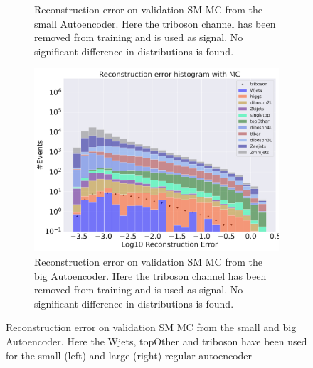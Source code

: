 \begin{figure}[H]
\begin{subfigure}{.45\textwidth}
        \caption{Reconstruction error on validation SM MC from the small Autoencoder. Here the triboson channel has been removed from training and 
        is used as signal. No significant difference in distributions is found. }
        \label{fig:ae_small_triboson}
    \end{subfigure}
    \hfill 
    \begin{subfigure}{.45\textwidth}
        \includegraphics[width=\textwidth]{Figures/AE_testing/big/b_data_recon_big_rm3_feats_sig_triboson.pdf}
        \caption{Reconstruction error on validation SM MC from the big Autoencoder. Here the triboson channel has been removed from training and 
        is used as signal. No significant difference in distributions is found. }
        \label{fig:ae_big_triboson}
    \end{subfigure}
    \hfill  
    \caption[AE | Channel removal, Wjets, topOther, triboson]{Reconstruction error on validation SM MC from the small and big Autoencoder. 
    Here the Wjets, topOther and triboson have been used for the small (left) and large (right) regular autoencoder}
    \label{fig:ae_big_channel4}
\end{figure}

